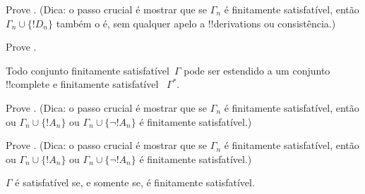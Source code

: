 \documentclass[../../../include/open-logic-section]{subfiles}
\begin{document}
\begin{prob}
Prove . (Dica: o passo crucial
é mostrar que se $\Gamma_n$ é finitamente satisfatível, então $\Gamma_n
\cup \{!D_n\}$ também o é, sem qualquer apelo a !!{derivation}s ou consistência.)
\end{prob}
\tagendprob


\begin{prob}
Prove .
\end{prob}
\tagendprob

\begin{lem}
 Todo conjunto finitamente satisfatível~$\Gamma$
pode ser estendido a um conjunto !!{complete} e finitamente satisfatível
~$\Gamma^*$.
\end{lem}

\begin{prob}
Prove .  (Dica: o passo crucial
é mostrar que se $\Gamma_n$ é finitamente satisfatível, então
ou $\Gamma_n \cup \{!A_n\}$ ou $\Gamma_n \cup \{\lnot !A_n\}$ é
finitamente satisfatível.)
\end{prob}
\tagendprob

\begin{prob}
Prove .  (Dica: o passo crucial
é mostrar que se $\Gamma_n$ é finitamente satisfatível, então
ou $\Gamma_n \cup \{!A_n\}$ ou $\Gamma_n \cup \{\lnot !A_n\}$ é
finitamente satisfatível.)
\end{prob}
\tagendprob

\begin{thm}[Compacidade]
 $\Gamma$ é satisfatível se, e somente se,
é finitamente satisfatível.
\end{thm}
\end{document}
